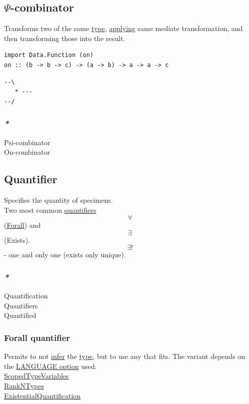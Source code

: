 \documentclass[11pt]{article}
\begin{document}
\subsection{\label{org878cb58}\(\Psi\)-combinator}
\label{sec:orgd62d7cf}
Transforms two of the same \hyperref[org4fbaeb8]{type}, \hyperref[orgc54ef49]{applying} same mediate transformation, and then transforming those into the result.\\
\begin{verbatim}
import Data.Function (on)
on :: (b -> b -> c) -> (a -> b) -> a -> a -> c
\end{verbatim}

\begin{verbatim}
--\
   * ---
--/
\end{verbatim}

\subsubsection{\emph{*}}
\label{sec:orgc132236}

\label{org537a1fc}Psi-combinator\\
\label{orgefefc14}On-combinator\\

\subsection{\label{org7158dde}Quantifier}
\label{sec:org8381dca}
Specifies the quantity of specimens.\\

Two most common \hyperref[orga67c681]{quantifiers} $$ \forall $$ (\hyperref[org746fdae]{Forall}) and $$ \exists $$ (Exists).\\
$$ \exists ! $$ - one and only one (exists only unique).\\

\subsubsection{\emph{*}}
\label{sec:org60ff590}

\label{org0e370df}Quantification\\
\label{orga67c681}Quantifiers\\
\label{org8d67434}Quantified\\

\subsubsection{\label{orgf7996c9}Forall quantifier}
\label{sec:org2ddf583}
Permits to not \hyperref[org774bd97]{infer} the \hyperref[org4fbaeb8]{type}, but to use any that fits. The variant depends on the \hyperref[org117158e]{LANGUAGE option} used:\\
\hyperref[org1f3d5d9]{ScopedTypeVariables}\\
\hyperref[org52ee511]{RankNTypes}\\
\hyperref[orgbfc2dfb]{ExistentialQuantification}\\
\end{document}

